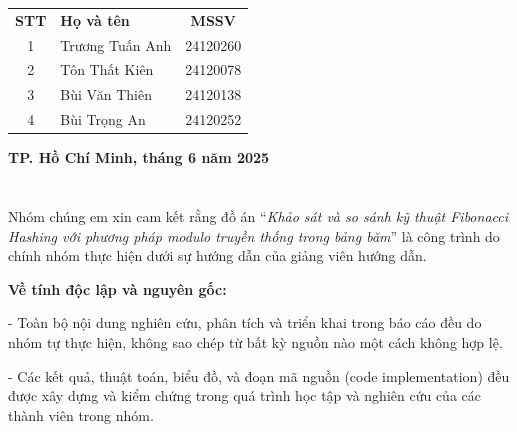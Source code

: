 \documentclass[12pt,a4paper]{report}
\begin{document}
\begin{center}
{\begin{minipage}{0.95\textwidth}
\begin{center}
                \renewcommand{\arraystretch}{1.2}
                \begin{tabular}{ c  l  c }
                
                    \textbf{STT} & \textbf{Họ và tên} & \textbf{MSSV} \\
                    
                    1 & Trương Tuấn Anh & 24120260 \\
                    2 & Tôn Thất Kiên & 24120078 \\
                    3 & Bùi Văn Thiên & 24120138 \\
                    4 & Bùi Trọng An & 24120252 \\
                
                \end{tabular}
                
                \vspace{11em}
                \textbf{TP. Hồ Chí Minh, tháng 6 năm 2025}
                \\[3em]
                \textbf{ }
            \end{center}
        \end{minipage}
    }
\end{center}

\newpage
{}
\setcounter{page}{1}

\chapter*{}

\setlength{\parindent}{2em}   %
\setlength{\parskip}{0.5em}     %

\noindent \indent Nhóm chúng em xin cam kết rằng đồ án “\textit{Khảo sát và so sánh kỹ thuật Fibonacci Hashing với phương pháp modulo truyền thống trong bảng băm}” là công trình do chính nhóm thực hiện dưới sự hướng dẫn của giảng viên hướng dẫn.

\textbf{Về tính độc lập và nguyên gốc:}

- Toàn bộ nội dung nghiên cứu, phân tích và triển khai trong báo cáo đều do nhóm tự thực hiện, không sao chép từ bất kỳ nguồn nào một cách không hợp lệ.

- Các kết quả, thuật toán, biểu đồ, và đoạn mã nguồn (code implementation) đều được xây dựng và kiểm chứng trong quá trình học tập và nghiên cứu của các thành viên trong nhóm.
\end{document}

